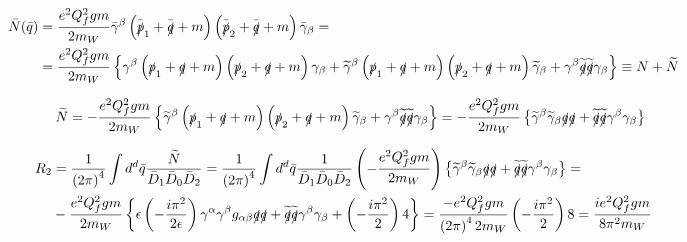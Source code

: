 \begin{align*}
\bar{N} (\bar{q}) & = \frac{e^2Q_f^2gm}{2m_W} \bar{\gamma}^{\beta} \left( \bar{\slashed{p}}_1 + \bar{\slashed{q}} + m \right) \left( \bar{\slashed{p}}_2 + \bar{\slashed{q}} + m \right) \bar{\gamma}_{\beta} = & \\
& = \frac{e^2Q_f^2gm}{2m_W} \left\lbrace \gamma^{\beta} \left( \slashed{p}_1 + \slashed{q} + m \right) \left( \slashed{p}_2 + \slashed{q} + m \right) \gamma_{\beta} + \widetilde{\gamma}^{\beta} \left( \slashed{p}_1 + \slashed{q} + m \right) \left( \slashed{p}_2 + \slashed{q} + m \right) \widetilde{\gamma}_{\beta} + \gamma^{\beta} \widetilde{\slashed{q}} \widetilde{\slashed{q}} \gamma_{\beta} \right\rbrace \equiv N + \widetilde{N} &
\end{align*}

\begin{equation*}
\widetilde{N} = -\frac{e^2Q_f^2gm}{2m_W} \left\lbrace \widetilde{\gamma}^{\beta} \left( \slashed{p}_1 + \slashed{q} + m \right) \left( \slashed{p}_2 + \slashed{q} + m \right) \widetilde{\gamma}_{\beta} + \gamma^{\beta} \widetilde{\slashed{q}} \widetilde{\slashed{q}} \gamma_{\beta} \right\rbrace = -\frac{e^2Q_f^2gm}{2m_W} \left\lbrace \widetilde{\gamma}^{\beta}\widetilde{\gamma}_{\beta} \slashed{q}\slashed{q} + \widetilde{\slashed{q}} \widetilde{\slashed{q}} \gamma^{\beta}\gamma_{\beta} \right\rbrace 
\end{equation*}

\begin{align*}
R_2 & = \frac{1}{\left( 2\pi \right)^4} \int d^d \bar{q} \frac{\widetilde{N}}{\bar{D}_1\bar{D}_0\bar{D}_2} = \frac{1}{\left( 2\pi \right)^4} \int d^d \bar{q} \frac{1}{\bar{D}_1\bar{D}_0\bar{D}_2} \left(-\frac{e^2Q_f^2gm}{2m_W} \right) \left\lbrace \widetilde{\gamma}^{\beta}\widetilde{\gamma}_{\beta} \slashed{q}\slashed{q} + \widetilde{\slashed{q}} \widetilde{\slashed{q}} \gamma^{\beta}\gamma_{\beta} \right\rbrace  = & \\
& -\frac{e^2Q_f^2gm}{2m_W} \left\lbrace \epsilon \left( -\frac{i\pi^2}{2\epsilon} \right) \gamma^{\alpha} \gamma^{\beta} g_{\alpha\beta} \slashed{q}\slashed{q} + \widetilde{\slashed{q}} \widetilde{\slashed{q}} \gamma^{\beta}\gamma_{\beta} + \left( - \frac{i\pi^2}{2} \right) 4 \right\rbrace = \frac{-e^2Q_f^2gm}{\left( 2\pi \right)^4 2m_W} \left( - \frac{i\pi^2}{2} \right) 8 = \frac{ie^2Q_f^2gm}{8\pi^2m_W} &
\end{align*}